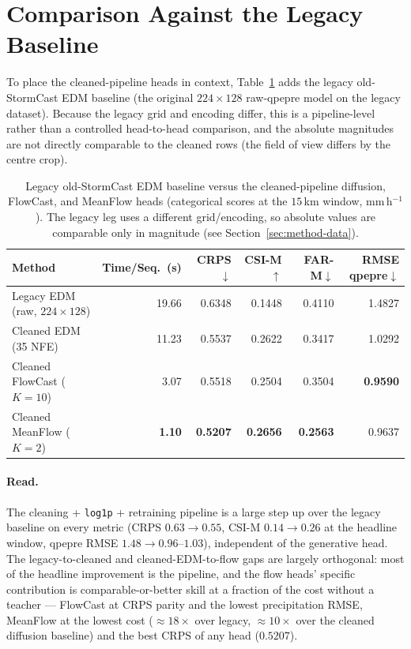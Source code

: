 \section{Comparison Against the Legacy Baseline}
\label{sec:exp-legacy}

To place the cleaned-pipeline heads in context, Table~\ref{tab:legacy} adds the legacy old-StormCast EDM baseline (the original $224\times128$ raw-qpepre model on the legacy dataset). Because the legacy grid and encoding differ, this is a pipeline-level rather than a controlled head-to-head comparison, and the absolute magnitudes are not directly comparable to the cleaned rows (the field of view differs by the centre crop).

\begin{table}[htbp]
  \centering
  \caption[Legacy versus cleaned pipeline]{Legacy old-StormCast EDM baseline versus the cleaned-pipeline diffusion, FlowCast, and MeanFlow heads (categorical scores at the $15$\,km window, mm\,h$^{-1}$). The legacy leg uses a different grid/encoding, so absolute values are comparable only in magnitude (see Section~\ref{sec:method-data}).}
  \label{tab:legacy}
  \small
  \setlength{\tabcolsep}{5pt}
  \begin{tabular}{lrrrrr}
    \toprule
    Method & Time/Seq.\ (s) & CRPS$\downarrow$ & CSI-M$\uparrow$ & FAR-M$\downarrow$ & RMSE qpepre$\downarrow$ \\
    \midrule
    Legacy EDM (raw, $224\times128$) & 19.66 & 0.6348 & 0.1448 & 0.4110 & 1.4827 \\
    Cleaned EDM (35 NFE)             & 11.23 & 0.5537 & 0.2622 & 0.3417 & 1.0292 \\
    Cleaned FlowCast ($K{=}10$)      & 3.07 & 0.5518 & 0.2504 & 0.3504 & \textbf{0.9590} \\
    Cleaned MeanFlow ($K{=}2$)       & \textbf{1.10} & \textbf{0.5207} & \textbf{0.2656} & \textbf{0.2563} & 0.9637 \\
    \bottomrule
  \end{tabular}
\end{table}

\paragraph{Read.} The cleaning + \texttt{log1p} + retraining pipeline is a large step up over the legacy baseline on every metric (CRPS $0.63 \to 0.55$, CSI-M $0.14 \to 0.26$ at the headline window, qpepre RMSE $1.48 \to 0.96$--$1.03$), independent of the generative head. The legacy-to-cleaned and cleaned-EDM-to-flow gaps are largely orthogonal: most of the headline improvement is the pipeline, and the flow heads' specific contribution is comparable-or-better skill at a fraction of the cost without a teacher --- FlowCast at CRPS parity and the lowest precipitation RMSE, MeanFlow at the lowest cost ($\approx 18\times$ over legacy, $\approx 10\times$ over the cleaned diffusion baseline) and the best CRPS of any head ($0.5207$).

